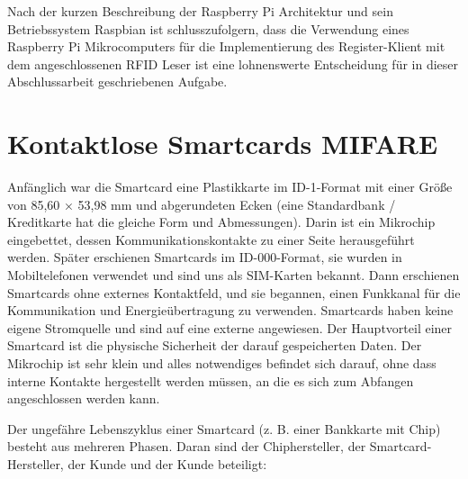 Nach der kurzen Beschreibung der Raspberry Pi Architektur und sein Betriebssystem Raspbian ist schlusszufolgern, dass die Verwendung eines Raspberry Pi Mikrocomputers für die Implementierung des Register-Klient mit dem angeschlossenen RFID Leser ist eine lohnenswerte Entscheidung für in dieser Abschlussarbeit geschriebenen Aufgabe.  


\section{Kontaktlose Smartcards MIFARE}
\label{sec:theorie:mifare}
Anfänglich war die Smartcard eine Plastikkarte im ID-1-Format mit einer Größe von 85,60 × 53,98 mm und abgerundeten Ecken (eine Standardbank / Kreditkarte hat die gleiche Form und Abmessungen). Darin ist ein Mikrochip eingebettet, dessen Kommunikationskontakte zu einer Seite herausgeführt werden. Später erschienen Smartcards im ID-000-Format, sie wurden in Mobiltelefonen verwendet und sind uns als SIM-Karten bekannt. Dann erschienen Smartcards ohne externes Kontaktfeld, und sie begannen, einen Funkkanal für die Kommunikation und Energieübertragung zu verwenden. Smartcards haben keine eigene Stromquelle und sind auf eine externe angewiesen. Der Hauptvorteil einer Smartcard ist die physische Sicherheit der darauf gespeicherten Daten. Der Mikrochip ist sehr klein und alles notwendiges befindet sich darauf, ohne dass interne Kontakte hergestellt werden müssen, an die es sich zum Abfangen angeschlossen werden kann. 

Der ungefähre Lebenszyklus einer Smartcard (z. B. einer Bankkarte mit Chip) besteht aus mehreren Phasen. Daran sind der Chiphersteller, der Smartcard-Hersteller, der Kunde und der Kunde beteiligt:

